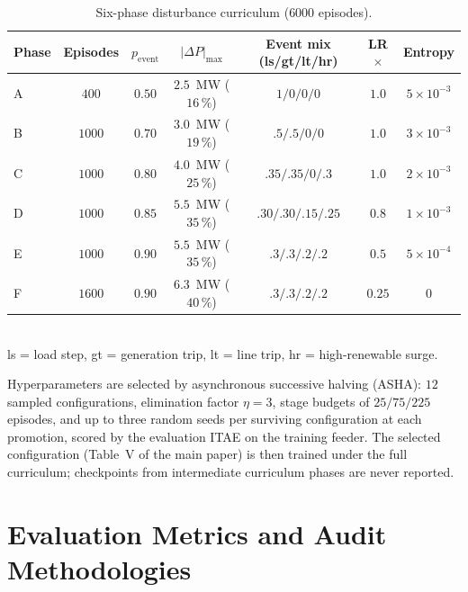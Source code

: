\documentclass[lettersize,journal]{IEEEtran}
\begin{document}
\begin{table}[!t]
\caption{Six-phase disturbance curriculum ($6000$ episodes).}
\label{tab:curriculum}
\centering
\footnotesize
\setlength{\tabcolsep}{3.5pt}
\begin{tabular}{lcccccc}
\toprule
Phase & Episodes & $p_{\mathrm{event}}$ & $|\Delta P|_{\max}$ & Event mix (ls/gt/lt/hr) & LR$\times$ & Entropy\\
\midrule
A & $400$  & $0.50$ & $2.5$~MW ($16\,\%$) & $1/0/0/0$            & $1.0$  & $5\!\times\!10^{-3}$\\
B & $1000$ & $0.70$ & $3.0$~MW ($19\,\%$) & $.5/.5/0/0$          & $1.0$  & $3\!\times\!10^{-3}$\\
C & $1000$ & $0.80$ & $4.0$~MW ($25\,\%$) & $.35/.35/0/.3$       & $1.0$  & $2\!\times\!10^{-3}$\\
D & $1000$ & $0.85$ & $5.5$~MW ($35\,\%$) & $.30/.30/.15/.25$    & $0.8$  & $1\!\times\!10^{-3}$\\
E & $1000$ & $0.90$ & $5.5$~MW ($35\,\%$) & $.3/.3/.2/.2$        & $0.5$  & $5\!\times\!10^{-4}$\\
F & $1600$ & $0.90$ & $6.3$~MW ($40\,\%$) & $.3/.3/.2/.2$        & $0.25$ & $0$\\
\bottomrule
\end{tabular}
\\[2pt]\footnotesize ls = load step, gt = generation trip, lt = line trip, hr = high-renewable surge.
\end{table}

Hyperparameters are selected by asynchronous successive halving (ASHA): $12$ sampled configurations, elimination factor $\eta=3$, stage budgets of $25/75/225$ episodes, and up to three random seeds per surviving configuration at each promotion, scored by the evaluation ITAE on the training feeder. The selected configuration (Table~V of the main paper) is then trained under the full curriculum; checkpoints from intermediate curriculum phases are never reported.

\section{Evaluation Metrics and Audit Methodologies}
\label{supp:metrics}
\end{document}
